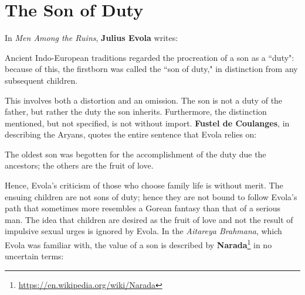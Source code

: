 \section{The Son of Duty}

\label{sec:SonDuty}

In \emph{Men Among the Ruins}, \textbf{Julius Evola} writes:

\begin{quotex}
Ancient Indo-European traditions regarded the procreation of a son as a ``duty": because of this, the firstborn was called the ``son of duty," in distinction from any subsequent children. 

\end{quotex}
This involves both a distortion and an omission. The son is not a duty of the father, but rather the duty the son inherits. Furthermore, the distinction mentioned, but not specified, is not without import. \textbf{Fustel de Coulanges}, in describing the Aryans, quotes the entire sentence that Evola relies on:

\begin{quotex}
The oldest son was begotten for the accomplishment of the duty due the ancestors; the others are the fruit of love. 

\end{quotex}
Hence, Evola's criticism of those who choose family life is without merit. The ensuing children are not sons of duty; hence they are not bound to follow Evola's path that sometimes more resembles a Gorean fantasy than that of a serious man. The idea that children are desired as the fruit of love and not the result of impulsive sexual urges is ignored by Evola. In the \emph{Aitareya Brahmana}, which Evola was familiar with, the value of a son is described by \textbf{Narada}\footnote{\url{https://en.wikipedia.org/wiki/Narada}} in no uncertain terms:


